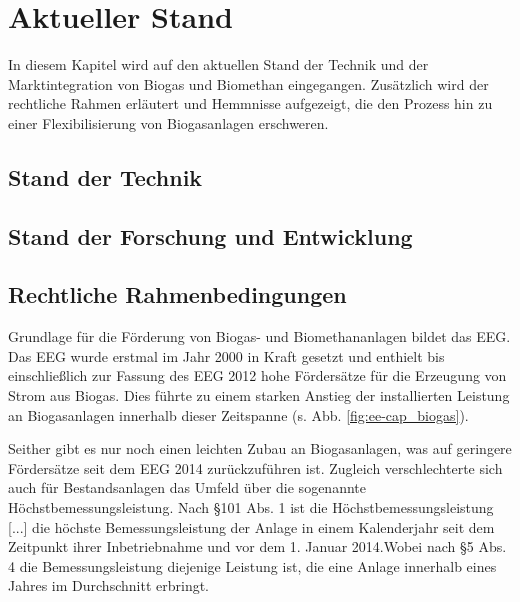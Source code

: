 \section{Aktueller Stand}

In diesem Kapitel wird auf den aktuellen Stand der Technik und der Marktintegration von Biogas und Biomethan eingegangen. Zusätzlich wird der rechtliche Rahmen erläutert und Hemmnisse aufgezeigt, die den Prozess hin zu einer Flexibilisierung von Biogasanlagen erschweren.

\subsection{Stand der Technik}


\subsection{Stand der Forschung und Entwicklung}

\subsection{Rechtliche Rahmenbedingungen}\label{chap:law_theo}

Grundlage für die Förderung von Biogas- und Biomethananlagen bildet das \gls{EEG}. Das \gls{EEG} wurde erstmal im Jahr 2000 in Kraft gesetzt und enthielt bis einschließlich zur Fassung des \gls{EEG} 2012 hohe Fördersätze für die Erzeugung von Strom aus Biogas. Dies führte zu einem starken Anstieg der installierten Leistung an Biogasanlagen innerhalb dieser Zeitspanne (s. Abb. \ref{fig:ee-cap_biogas}). \parencite{DanielGromke2019}\smallskip

Seither gibt es nur noch einen leichten Zubau an Biogasanlagen, was auf geringere Fördersätze seit dem \gls{EEG} 2014 zurückzuführen ist. Zugleich verschlechterte sich auch für Bestandsanlagen das Umfeld über die sogenannte Höchstbemessungsleistung. Nach \S 101 Abs. 1 ist die \glqq{} Höchstbemessungsleistung [...] die höchste Bemessungsleistung der Anlage in einem Kalenderjahr seit dem Zeitpunkt ihrer Inbetriebnahme und vor dem 1. Januar 2014.\grqq Wobei nach \S 5 Abs. 4 die Bemessungsleistung diejenige Leistung ist, die eine Anlage innerhalb eines Jahres im Durchschnitt erbringt. \parencite{BJV2014a} \smallskip


